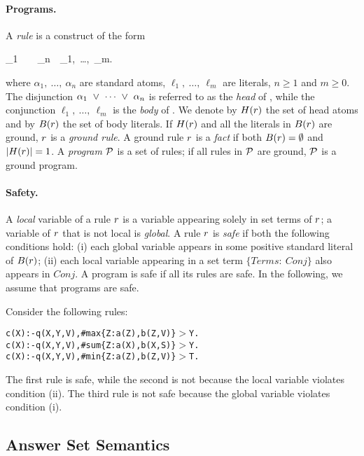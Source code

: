 \documentclass{tlp}
\begin{document}
\paragraph{Programs.}
A {\em rule} \R{} is a construct of the form
\begin{dlvcode}
\alpha_1\ \Or\ \cdots\ \Or\ \alpha_n\ \derives\ \ell_1,\ \ldots,\ \ell_m.
\end{dlvcode}\noindent where $\alpha_1,\ \ldots,\ \alpha_n$ are standard atoms, $\ell_1,\ \ldots,\ \ell_m$ are literals, $n \geq 1$ and $m \geq 0$.
The disjunction $\alpha_1\ \Or\ \cdots\ \Or\ \alpha_n$ is referred to as the {\em head} of \R{}, while the conjunction $\ell_1,\ \ldots,\ \ell_m$ is the {\em body} of \R{}.
We denote by $H(r)$ the set of head atoms and by $B(r)$ the set of body literals.
If $H(r)$ and all the literals in $B(r)$ are ground, $r$ is a {\em ground rule}.
A ground rule $r$ is a {\em fact} if both $B(r)=\emptyset$ and $|H(r)| = 1$.
A {\em program} ${\cal P}$ is a set of rules; if all rules in ${\cal P}$ are ground, ${\cal P}$ is a ground program.


\paragraph{Safety.}
A {\em local} variable of a rule $r$ is a variable appearing solely in set terms of $r$;
a variable of $r$ that is not local is {\em global}.
A rule $r$ is {\em safe} if both the following conditions hold:
(i) each global variable appears in some positive standard literal of $B(r)$;
(ii) each local variable appearing in a set term $\{\mathit{Terms}:\ \mathit{Conj}\}$ also appears in $\mathit{Conj}$.
A program is safe if all its rules are safe.
In the following, we assume that programs are safe.

\begin{example}\label{ex:safety}\rm
Consider the following rules:
\begin{alltt}\small
 c(X) :- q(X,Y,V), #max\{Z: a(Z), b(Z,V)\} \(>\) Y.
 c(X) :- q(X,Y,V), #sum\{Z: a(X), b(X,S)\} \(>\) Y.
 c(X) :- q(X,Y,V), #min\{Z: a(Z), b(Z,V)\} \(>\) T.
\end{alltt}\normalsize
The first rule is safe, while the second is not because the local variable  violates condition (ii).
The third rule is not safe because the global variable  violates condition (i).
\punto
\end{example}


\subsection{Answer Set Semantics}
\label{sec:semantics}
\end{document}
